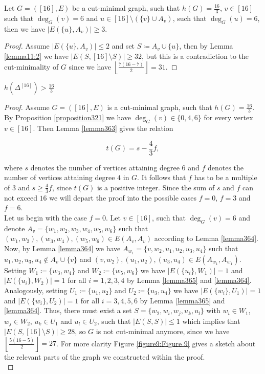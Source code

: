 \begin{lem}\label{lemma368}
Let \(G=([16],E)\) be a cut-minimal graph, such that \(h(G)=\frac{16}{3}\), \(v\in [16]\) such that \(\deg_G(v)=6\) and \(u\in [16]\setminus (\{v\}\cup A_v)\), such that \(\deg_G(u)=6\), then we have \(|E(\{u\},A_v)|\geq 3\).
\begin{proof}
Assume \(|E(\{u\},A_v)|\leq 2\) and set \(S\coloneqq A_v\cup\{u\}\), then by Lemma \ref{lemma11:2} we have \(|E(S,[16]\setminus S)|\geq 32\), but this is a contradiction to the cut-minimality of \(G\) since we have \(\left\lfloor\frac{7(16-7)}{2}\right\rfloor=31\).
\end{proof}
\end{lem}

\begin{thm}
\(h(\Delta^{[16]})>\frac{16}{3}\)
\begin{proof}
Assume \(G=([16],E)\) is a cut-minimal graph, such that \(h(G)=\frac{16}{3}\). By Proposition \ref{proposition321} we have \(\deg_G(v)\in\{0,4,6\}\) for every vertex \(v\in [16]\). Then Lemma \ref{lemma363} gives the relation

\begin{equation}\label{equation361}
t(G)=s-\frac{4}{3}f,
\end{equation}

where \(s\) denotes the number of vertices attaining degree \(6\) and \(f\) denotes the number of vertices attaining degree \(4\) in \(G\). It follows that \(f\) has to be a multiple of \(3\) and \(s\geq\frac{4}{3}f\), since \(t(G)\) is a positive integer. Since the sum of \(s\) and \(f\) can not exceed \(16\) we will depart the proof into the possible cases \(f=0\), \(f=3\) and \(f=6\).\\
Let us begin with the case \(f=0\). Let \(v\in [16]\), such that \(\deg_G(v)=6\) and denote \(A_v=\{w_1,w_2,w_3,w_4,w_5,w_6\}\) such that \((w_1,w_2),(w_3,w_4),(w_5,w_6)\in E(A_v,A_v)\) according to Lemma \ref{lemma364}. Now, by Lemma \ref{lemma364} we have \(A_{w_1}=\{v,w_2,u_1,u_2,u_3,u_4\}\) such that \(u_1,u_2,u_3,u_4\notin A_v\cup \{v\}\) and \((v,w_2),(u_1,u_2),(u_3,u_4)\in E(A_{w_1},A_{w_1})\). Setting \(W_1\coloneqq\{w_3,w_4\}\) and \(W_2\coloneqq\{w_5,w_6\}\) we have \(|E(\{u_i\},W_1)|=1\) and\\
\(|E(\{u_i\},W_2)|=1\) for all \(i=1,2,3,4\) by Lemma \ref{lemma365} and \ref{lemma364}. Analogously, setting \(U_1\coloneqq\{u_1,u_2\}\) and \(U_2\coloneqq\{u_3,u_4\}\) we have \(|E(\{w_i\},U_1)|=1\) and \(|E(\{w_i\},U_2)|=1\) for all \(i=3,4,5,6\) by Lemma \ref{lemma365} and \ref{lemma364}. Thus, there must exist a set \(S=\{w_2,w_i,w_j,u_k,u_l\}\) with \(w_i\in W_1\), \(w_j\in W_2\), \(u_k\in U_1\) and \(u_l\in U_2\), such that \(|E(S,S)|\leq 1\) which implies that \(|E(S,[16]\setminus S)|\geq 28\), so \(G\) is not cut-minimal anymore, since we have \(\left\lfloor\frac{5(16-5)}{2}\right\rfloor=27\). For more clarity Figure \ref{figure9:Figure 9} gives a sketch about the relevant parts of the graph we constructed within the proof.\\


\end{proof}
\end{thm}
